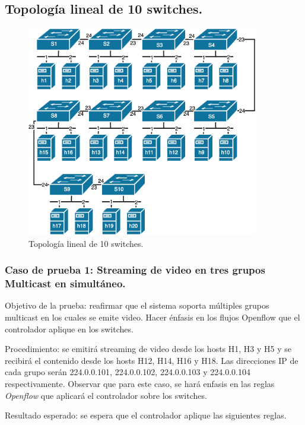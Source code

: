 \documentclass[12pt,a4paper,oneside]{book}
\begin{document}
\subsection{Topología lineal de 10 switches.}

\begin{figure}[ht]
 \centering
 \includegraphics[width=0.9\textwidth]{fotos/5_Pruebas/1_topo_lineales/grande.png}
 \caption{Topología lineal de 10 switches.}
 \label{topo_lineal_grande}
\end{figure}


\subsubsection{Caso de prueba 1: Streaming de video en tres grupos Multicast en simultáneo.} 
\label{prueba3grupostopograndelineal}
Objetivo de la prueba: reafirmar que el sistema soporta múltiples grupos multicast en los cuales se emite video. Hacer énfasis en los flujos Openflow que el controlador aplique en los switches.

\vspace{0.5cm}
Procedimiento: se emitirá streaming de video desde los hosts H1, H3 y H5 y se recibirá el contenido desde los hosts H12, H14, H16 y H18. Las direcciones IP de cada grupo serán 224.0.0.101, 224.0.0.102, 224.0.0.103 y 224.0.0.104 respectivamente. Observar que para este caso, se hará enfasis en las reglas \textit{Openflow} que aplicará el controlador sobre los switches.

\vspace{0.5cm}
Resultado esperado: se espera que el controlador aplique las siguientes reglas.
\end{document}
